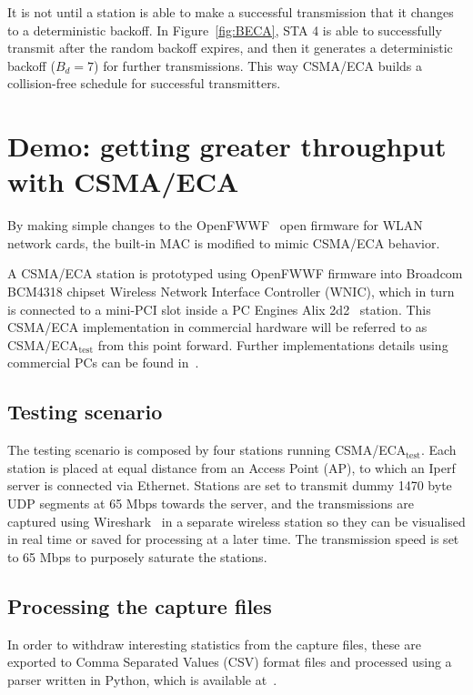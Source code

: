\documentclass[a4paper,journal]{IEEEtran}
\begin{document}
It is not until a station is able to make a successful transmission that it changes to a deterministic backoff. In Figure~\ref{fig:BECA}, STA 4 is able to successfully transmit after the random backoff expires, and then it generates a deterministic backoff ($B_{d}=7$) for further transmissions. This way CSMA/ECA builds a collision-free schedule for successful transmitters.

\section{Demo: getting greater throughput with CSMA/ECA}\label{prototype}
By making simple changes to the OpenFWWF~\cite{OpenFWWF} open firmware for WLAN network cards, the built-in MAC is modified to mimic CSMA/ECA behavior.


A CSMA/ECA station is prototyped using OpenFWWF firmware into Broadcom BCM4318 chipset Wireless Network Interface Controller (WNIC), which in turn is connected to a mini-PCI slot inside a PC Engines Alix 2d2~\cite{Alix2d2} station. This CSMA/ECA implementation in commercial hardware will be referred to as CSMA/ECA$_{\text{test}}$ from this point forward. Further implementations details using commercial PCs can be found in~\cite{BECA-test}.

	\subsection{Testing scenario}
	The testing scenario is composed by four stations running CSMA/ECA$_{\text{test}}$. Each station is placed at equal distance from an Access Point (AP), to which an Iperf~\cite{tirumala2005iperf} server is connected via Ethernet. Stations are set to transmit dummy 1470 byte UDP segments at 65 Mbps towards the server, and the transmissions are captured using Wireshark~\cite{combs2007wireshark} in a separate wireless station so they can be visualised in real time or saved for processing at a later time. The transmission speed is set to 65 Mbps to purposely saturate the stations.
	
	\subsection{Processing the capture files}
	In order to withdraw interesting statistics from the capture files, these are exported to Comma Separated Values (CSV) format files and processed using a parser written in Python, which is available at~\cite{pcapParser}.
	
\end{document}
